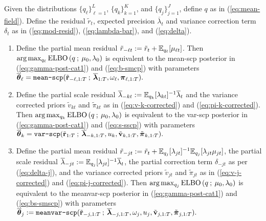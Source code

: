 \begin{proposition} 
\label{prop:vb}
Given the distributions $\{q_\ell\}_{\ell=1}^L$, $\{q_k\}_{k=1}^K$, and $\{q_j\}_{j=1}^J$, define $q$ as in (\ref{eq:mean-field}). Define the residual $\tilde{r}_t$, expected precision $\overline{\lambda}_t$ and variance correction term $\delta_t$ as in (\ref{eq:mod-resid}), (\ref{eq:lambda-bar}), and (\ref{eq:delta}).
\vspace{-10pt}

\begin{enumerate}[label=\normalfont(\roman*)]
    \itemsep0em 
    \item Define the partial mean residual $\tilde{r}_{-\ell t} :=  \tilde{r}_{t} + \mathbb{E}_{q_{\ell}}[\mu_{\ell t}]$. Then $\text{\normalfont{arg}}\max_{q_\ell} \text{\normalfont ELBO}\left(q\:;\:\mu_0,\lambda_0\right)$ is equivalent to the mean-scp posterior in (\ref{eq:gamma-post-cat1}) and (\ref{eq:b-smcp}) with parameters $\overline{\boldsymbol{\theta}}_\ell = \normalfont{\texttt{mean-scp}}(\tilde{\mathbf{r}}_{-\ell,1:T} \:;\: \overline{\boldsymbol{\lambda}}_{1:T}, \omega_{\ell}, \boldsymbol{\pi}_{\ell,1:T}).$ 
    
    \item Define the partial scale residual $\overline{\lambda}_{-kt} := \mathbb{E}_{q_k}[\lambda_{k t}]^{-1}\overline{\lambda}_t$ and the variance corrected priors $\tilde{v}_{kt}$ and $\tilde{\pi}_{kt}$ as in (\ref{eq:v-k-corrected}) and (\ref{eq:pi-k-corrected}). Then $\text{\normalfont{arg}}\max_{q_k} \text{\normalfont ELBO}\left(q\:;\:\mu_0,\lambda_0\right)$ is equivalent to the var-scp posterior in (\ref{eq:gamma-post-cat1}) and (\ref{eq:s-sscp}) with parameters $\overline{\boldsymbol{\theta}}_k = \normalfont{\texttt{var-scp}}(\tilde{\mathbf{r}}_{1:T} \:;\:\overline{\boldsymbol{\lambda}}_{-k,1:T}, u_k, \tilde{\mathbf{v}}_{k,1:T}, \tilde{\boldsymbol{\pi}}_{k,1:T}).$
    
    \item Define the partial mean residual $\tilde{r}_{-jt} := \tilde{r}_{t} +\mathbb{E}_{q_j}[\lambda_{jt}]^{-1} \mathbb{E}_{q_j}[\lambda_{jt} \mu_{j t}]$, the partial scale residual $\overline{\lambda}_{-jt} := \mathbb{E}_{q_j}[\lambda_{j t}]^{-1}\overline{\lambda}_t$, the partial correction term $\delta_{-jt}$ as per (\ref{eq:delta-j}), and the variance corrected priors $\tilde{v}_{jt}$ and $\tilde{\pi}_{jt}$ as in (\ref{eq:v-j-corrected}) and (\ref{eq:pi-j-corrected}). Then $\text{\normalfont{arg}}\max_{q_j} \text{\normalfont ELBO}\left(q\:;\:\mu_0,\lambda_0\right)$ is equivalent to the meanvar-scp posterior in (\ref{eq:gamma-post-cat1}) and (\ref{eq:bs-smscp}) with parameters $\overline{\boldsymbol{\theta}}_j := \normalfont{\texttt{meanvar-scp}}(\tilde{\mathbf{r}}_{-j,1:T} \:;\:\overline{\boldsymbol{\lambda}}_{-j,1:T}, \omega_j, u_j, \tilde{\mathbf{v}}_{j,1:T}, \tilde{\boldsymbol{\pi}}_{j,1:T}).$
\end{enumerate}
\end{proposition}
